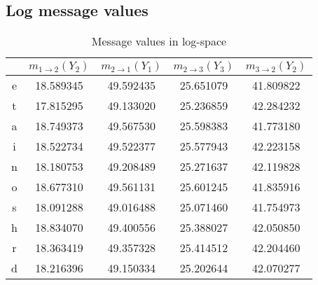 \documentclass[11pt]{article}
\begin{document}
\subsection{Log message values}

\begin{table}[H]
    \caption{Message values in log-space}
    \centering
    \begin{tabular}{cSSSS}
        \toprule
          &  &  &  &  \\
        \midrule
        e & 18.589345                                      & 49.592435                                      & 25.651079                                      & 41.809822                                      \\
        t & 17.815295                                      & 49.133020                                      & 25.236859                                      & 42.284232                                      \\
        a & 18.749373                                      & 49.567530                                      & 25.598383                                      & 41.773180                                      \\
        i & 18.522734                                      & 49.522377                                      & 25.577943                                      & 42.223158                                      \\
        n & 18.180753                                      & 49.208489                                      & 25.271637                                      & 42.119828                                      \\
        o & 18.677310                                      & 49.561131                                      & 25.601245                                      & 41.835916                                      \\
        s & 18.091288                                      & 49.016488                                      & 25.071460                                      & 41.754973                                      \\
        h & 18.834070                                      & 49.400556                                      & 25.388027                                      & 42.050850                                      \\
        r & 18.363419                                      & 49.357328                                      & 25.414512                                      & 42.204460                                      \\
        d & 18.216396                                      & 49.150334                                      & 25.202644                                      & 42.070277                                      \\
        \bottomrule
    \end{tabular}
\end{table}
\end{document}
